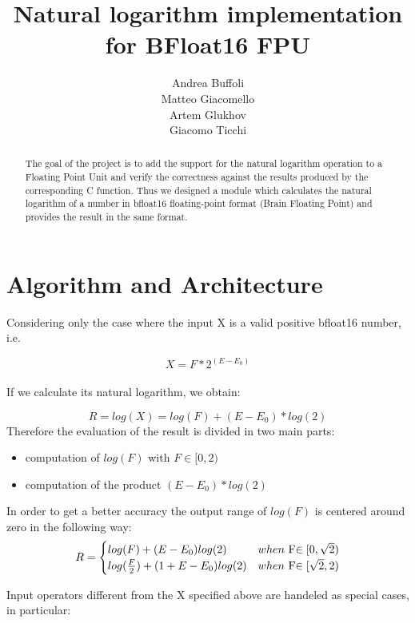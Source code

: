 \documentclass{report}
\begin{document}
\title{Natural logarithm implementation for BFloat16 FPU}
\author{
Andrea Buffoli\\
Matteo Giacomello\\
Artem Glukhov\\
Giacomo Ticchi
}


\maketitle
\begin{abstract}
The goal of the project is to add the support for the natural logarithm operation to a Floating Point Unit and verify the correctness against the results produced by the corresponding C function.
Thus we designed a module which calculates the natural logarithm of a number in bfloat16 floating-point format (Brain Floating Point) and provides the result in the same format. 

\end{abstract}

\chapter{Algorithm and Architecture}
Considering only the case where the input X is a valid positive bfloat16 number, i.e.

$$X=F*2^{(E-E_0)}$$
\\If we calculate its natural logarithm, we obtain:

$$R = log(X) = log(F)+(E-E_0)*log(2)$$
Therefore the evaluation of the result is divided in two main parts:
\begin{itemize}
\item computation of $log(F)$ with $ F \in [0,2)$
\item computation of the product $(E-E_0)*log(2)$
\end{itemize}
In order to get a better accuracy the output range of $log(F)$ is centered around zero in the following way:
\[
R=
\begin{cases}
        log(F)+(E-E_0)log(2)  & when  $ F$ \in[0,\sqrt{2})\\
        log(\frac{F}{2})+(1+E-E_0)log(2) & when  $ F$ \in[\sqrt{2},2)
\end{cases}
\]

Input operators different from the X specified above are handeled as special cases, in particular:
\end{document}
